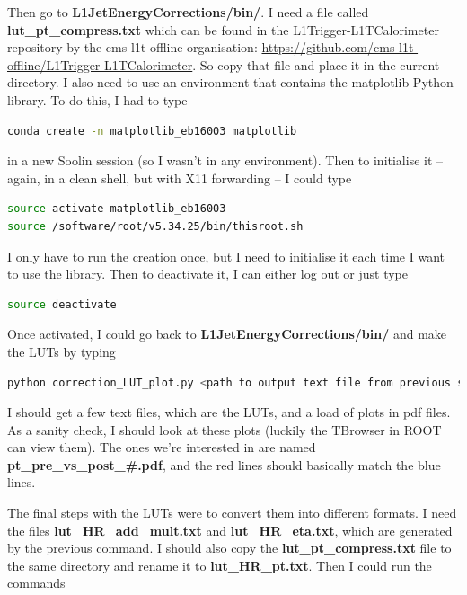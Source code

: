 Then go to \textbf{L1JetEnergyCorrections/bin/}. I need a file called \textbf{lut\_pt\_compress.txt} which can be found in the L1Trigger-L1TCalorimeter repository by the cms-l1t-offline organisation: \url{https://github.com/cms-l1t-offline/L1Trigger-L1TCalorimeter}. So copy that file and place it in the current directory. I also need to use an environment that contains the matplotlib Python library. To do this, I had to type

\begin{lstlisting}[belowskip=-0.7cm, language=sh, numbers=none]
conda create -n matplotlib_eb16003 matplotlib
\end{lstlisting}

in a new Soolin session (so I wasn't in any environment). Then to initialise it -- again, in a clean shell, but with X11 forwarding -- I could type

\begin{lstlisting}[belowskip=-0.7cm, language=sh, numbers=none]
source activate matplotlib_eb16003
source /software/root/v5.34.25/bin/thisroot.sh
\end{lstlisting}

I only have to run the creation once, but I need to initialise it each time I want to use the library. Then to deactivate it, I can either log out or just type

\begin{lstlisting}[belowskip=-0.7cm, language=sh, numbers=none]
source deactivate
\end{lstlisting}

Once activated, I could go back to \textbf{L1JetEnergyCorrections/bin/} and make the LUTs by typing

\begin{lstlisting}[belowskip=-0.7cm, language=sh, numbers=none]
python correction_LUT_plot.py <path to output text file from previous step> <output path>/lut_HR.txt --stage2 --plots --text --ptCompressionFile lut_pt_compress.txt
\end{lstlisting}

I should get a few text files, which are the LUTs, and a load of plots in pdf files. As a sanity check, I should look at these plots (luckily the TBrowser in ROOT can view them). The ones we're interested in are named \textbf{pt\_pre\_vs\_post\_\#.pdf}, and the red lines should basically match the blue lines. 

The final steps with the LUTs were to convert them into different formats. I need the files \textbf{lut\_HR\_add\_mult.txt} and \textbf{lut\_HR\_eta.txt}, which are generated by the previous command. I should also copy the \textbf{lut\_pt\_compress.txt} file to the same directory and rename it to \textbf{lut\_HR\_pt.txt}. Then I could run the commands

